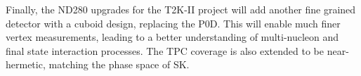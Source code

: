 Finally, the ND280 upgrades\cite{t2k_upgrades} for the T2K-II project\cite{t2k_ii} will add another fine grained detector with a cuboid design, replacing the P0D. This will enable much finer vertex measurements, leading to a better understanding of multi-nucleon and final state interaction processes. The TPC coverage is also extended to be near-hermetic, matching the phase space of SK.
